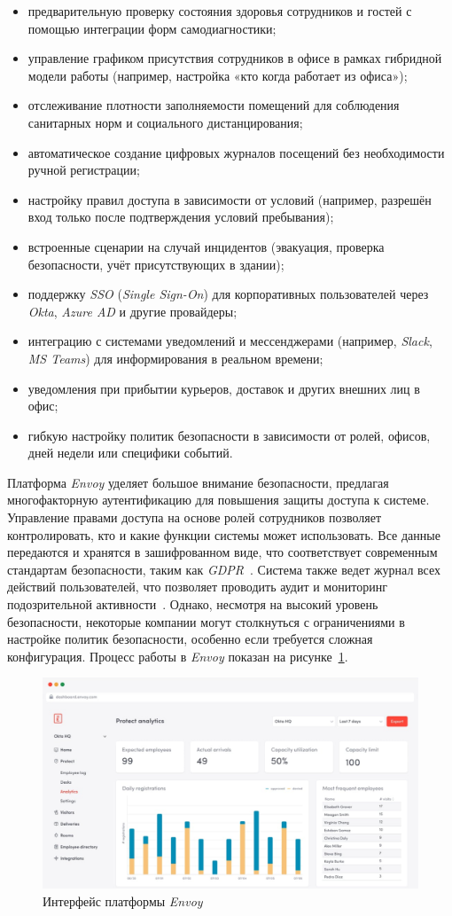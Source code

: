 \begin{itemize}
    \item предварительную проверку состояния здоровья сотрудников и гостей с помощью интеграции форм самодиагностики;
    \item управление графиком присутствия сотрудников в офисе в рамках гибридной модели работы (например, настройка «кто когда работает из офиса»);
    \item отслеживание плотности заполняемости помещений для соблюдения санитарных норм и социального дистанцирования;
    \item автоматическое создание цифровых журналов посещений без необходимости ручной регистрации;
    \item настройку правил доступа в зависимости от условий (например, разрешён вход только после подтверждения условий пребывания);
    \item встроенные сценарии на случай инцидентов (эвакуация, проверка безопасности, учёт присутствующих в здании);
    \item поддержку \textit{SSO} (\textit{Single Sign-On}) для корпоративных пользователей через \textit{Okta}, \textit{Azure AD} и другие провайдеры;
    \item интеграцию с системами уведомлений и мессенджерами (например, \textit{Slack}, \textit{MS Teams}) для информирования в реальном времени;
    \item уведомления при прибытии курьеров, доставок и других внешних лиц в офис;
    \item гибкую настройку политик безопасности в зависимости от ролей, офисов, дней недели или специфики событий.
\end{itemize}

Платформа \textit{Envoy} уделяет большое внимание безопасности, предлагая многофакторную аутентификацию для повышения защиты доступа к системе. Управление правами доступа на основе ролей сотрудников позволяет контролировать, кто и какие функции системы может использовать. Все данные передаются и хранятся в зашифрованном виде, что соответствует современным стандартам безопасности, таким как \textit{GDPR}~\cite{web_gdpr}. Система также ведет журнал всех действий пользователей, что позволяет проводить аудит и мониторинг подозрительной активности~\cite{web_envoy_employee_data}. Однако, несмотря на высокий уровень безопасности, некоторые компании могут столкнуться с ограничениями в настройке политик безопасности, особенно если требуется сложная конфигурация. Процесс работы в \textit{Envoy} показан на рисунке~\ref{fig:envoy-demo}.

\begin{figure}[h]
\centering
    \includegraphics[width=0.99\linewidth]{assets/envoy-demo.png}
    \caption{Интерфейс платформы \textit{Envoy}}
    \label{fig:envoy-demo}
\end{figure}
